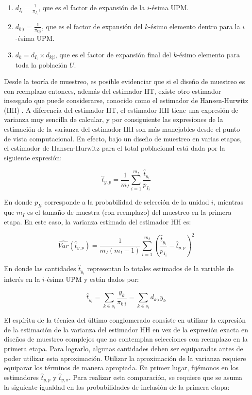 \documentclass[
  12pt,
  spanish,
]{book}
\providecommand{\tightlist}{%
  \setlength{\itemsep}{0pt}\setlength{\parskip}{0pt}}
\begin{document}
\begin{enumerate}
\def\labelenumi{\arabic{enumi}.}
\tightlist
\item
  \(d_{I_i} = \frac{1}{\pi_{I_i}}\), que es el factor de expansión de la \(i\)-ésima UPM.
\item
  \(d_{k|i} = \frac{1}{\pi_{k|i}}\), que es el factor de expansión del \(k\)-ésimo elemento dentro para la \(i\)-ésima UPM.
\item
  \(d_k = d_{I_i} \times d_{k|i}\), que es el factor de expansión final del \(k\)-ésimo elemento para toda la población \(U\).
\end{enumerate}

Desde la teoría de muestreo, es posible evidenciar que si el diseño de muestreo es con reemplazo entonces, además del estimador HT, existe otro estimador insesgado que puede considerarse, conocido como el estimador de Hansen-Hurwitz (HH) \citep{Gutierrez_2016}. A diferencia del estimador HT, el estimador HH tiene una expresión de varianza muy sencilla de calcular, y por consiguiente las expresiones de la estimación de la varianza del estimador HH son más manejables desde el punto de vista computacional. En efecto, bajo un diseño de muestreo en varias etapas, el estimador de Hansen-Hurwitz para el total poblacional está dada por la siguiente expresión:

\[
\hat{t}_{y,p}=\frac{1}{m_I}\sum_{i=1}^{m_I}\frac{\hat{t}_{y_i}}{p_{I_i}}
\]

En donde \(p_{Ii}\) corresponde a la probabilidad de selección de la unidad \(i\), mientras que \(m_I\) es el tamaño de muestra (con reemplazo) del muestreo en la primera etapa. En este caso, la varianza estimada del estimador HH es:

\[
\widehat{Var}(\hat{t}_{y,p})=\frac{1}{m_I(m_I-1)}\sum_{i=1}^{m_I}\left(\frac{\hat{t}_{y_i}}{p_{I_i}}-\hat{t}_{y,p}\right)^2
\]

En donde las cantidades \(\hat{t}_{y_i}\) representan lo totales estimados de la variable de interés en la \(i\)-ésima UPM y están dados por:

\[
\hat{t}_{y_i} = \sum_{k \in s_i} \frac{y_k}{\pi_{k|i}}
= \sum_{k \in s_i} d_{k|i} y_k 
\]

El espíritu de la técnica del último conglomerado consiste en utilizar la expresión de la estimación de la varianza del estimador HH en vez de la expresión exacta en diseños de muestreo complejos que no contemplan selecciones con reemplazo en la primera etapa. Para lograrlo, algunas cantidades deben ser equiparadas antes de poder utilizar esta aproximación.
Utilizar la aproximación de la varianza requiere equiparar los términos de manera apropiada. En primer lugar, fijémonos en los estimadores \(\hat{t}_{y,p}\) y \(\hat{t}_{y,\pi}\). Para realizar esta comparación, se requiere que
se asuma la siguiente igualdad en las probabilidades de inclusión de la primera etapa:
\end{document}
